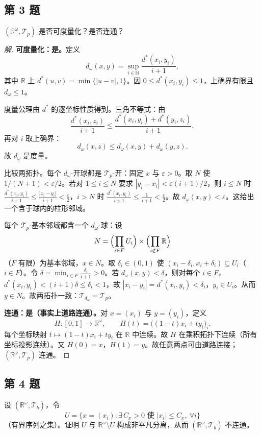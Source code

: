\documentclass[11pt,a4paper]{article}
\newcommand{\R}{\mathbb{R}}
\newcommand{\N}{\mathbb{N}}
\theoremstyle{definition}
\newenvironment{solution}{\begin{proof}[解]}{\end{proof}}
\begin{document}
\subsection{第 3 题}

$(\R^\omega, \mathcal{T}_p)$ 是否可度量化？是否连通？

\begin{solution}
\textbf{可度量化：是。}定义
\[
  d_\omega(x,y) = \sup_{i \in \N} \frac{d^*(x_i,y_i)}{i+1},
\]
其中 $\R$ 上 $d^*(u,v) = \min\{|u-v|,1\}$。因 $0 \le d^*(x_i,y_i) \le 1$，上确界有限且 $d_\omega \le 1$。

度量公理由 $d^*$ 的逐坐标性质得到。三角不等式：由
\[
  \frac{d^*(x_i,z_i)}{i+1} \le \frac{d^*(x_i,y_i) + d^*(y_i,z_i)}{i+1},
\]
再对 $i$ 取上确界：
\[
  d_\omega(x,z) \le d_\omega(x,y) + d_\omega(y,z).
\]
故 $d_\omega$ 是度量。

比较两拓扑。每个 $d_\omega$-开球都是 $\mathcal{T}_p$-开：固定 $x$ 与 $\varepsilon > 0$。取 $N$ 使 $1/(N+1) < \varepsilon/2$。若对 $1 \le i \le N$ 要求 $|y_i - x_i| < \varepsilon(i+1)/2$，则 $i \le N$ 时 $\frac{d^*(x_i,y_i)}{i+1} \le \frac{|x_i-y_i|}{i+1} < \frac\varepsilon2$，$i > N$ 时 $\frac{d^*(x_i,y_i)}{i+1} \le \frac{1}{i+1} < \frac\varepsilon2$。故 $d_\omega(x,y) < \varepsilon$。这给出一个含于球内的柱形邻域。

每个 $\mathcal{T}_p$-基本邻域都含一个 $d_\omega$-球：设
\[
  N = \Bigl(\prod_{i \in F} U_i\Bigr) \times \Bigl(\prod_{i \notin F} \R\Bigr)
\]
（$F$ 有限）为基本邻域，$x \in N$。取 $\delta_i \in (0,1)$ 使 $(x_i - \delta_i, x_i + \delta_i) \subseteq U_i$（$i \in F$）。令 $\delta = \min_{i \in F} \frac{\delta_i}{i+1} > 0$。若 $d_\omega(x,y) < \delta$，则对每个 $i \in F$，$d^*(x_i,y_i) < (i+1)\delta \le \delta_i < 1$，故 $|x_i - y_i| = d^*(x_i,y_i) < \delta_i$，$y_i \in U_i$。从而 $y \in N$。故两拓扑一致：$\mathcal{T}_{d_\omega} = \mathcal{T}_p$。

\textbf{连通：是（事实上道路连通）。}对 $x = (x_i)$ 与 $y = (y_i)$，定义
\[
  H : [0,1] \to \R^\omega, \qquad H(t) = \bigl((1-t)x_i + t y_i\bigr)_i.
\]
每个坐标映射 $t \mapsto (1-t)x_i + t y_i$ 在 $\R$ 中连续。故 $H$ 在乘积拓扑下连续（所有坐标投影连续）。又 $H(0) = x$，$H(1) = y$。故任意两点可由道路连接；$(\R^\omega, \mathcal{T}_p)$ 连通。
\end{solution}

\subsection{第 4 题}

设 $(\R^\omega, \mathcal{T}_b)$，令
\[
  U = \{x = (x_i) : \exists\, C_x > 0 \text{ 使 } |x_i| \le C_x,\ \forall i\}
\]
（有界序列之集）。证明 $U$ 与 $\R^\omega \setminus U$ 构成非平凡分离，从而 $(\R^\omega, \mathcal{T}_b)$ 不连通。
\end{document}

